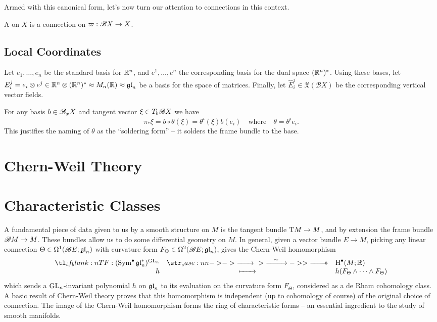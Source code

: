Armed with this canonical form, let's now turn our attention to connections in this context.

\begin{definition}
  A  on $X$ is a connection on $\varpi : \mathscr{B} X \to X$.
\end{definition}

\subsection{Local Coordinates}

Let $e_1,\ldots, e_n$ be the standard basis for $\mathbb{R}^n$, and $e^1,\ldots,e^n$ the corresponding basis for the dual space $(\mathbb{R}^n)^*$. Using these bases, let $E_i^j = e_i\otimes e^j \in \mathbb{R}^n\otimes(\mathbb{R}^n)^* \approx M_n(\mathbb{R}) \approx \mathfrak{gl}_n$ be a basis for the space of matrices. Finally, let $\widehat{E}_i^j\in \mathfrak{X}(\mathscr{B}X)$ be the corresponding vertical vector fields.

For any basis $b\in \mathscr{B}_x X$ and tangent vector $\xi\in T_b \mathscr{B} X$ we have
\[
  \pi_*\xi =  b\circ \theta(\xi) = \theta^i(\xi) b(e_i)\quad\textrm{where}\quad \theta = \theta^i e_i.
\]
This justifies the naming of $\theta$ as the ``soldering form'' -- it solders the frame bundle to the base.


\section{Chern-Weil Theory}

\section{Characteristic Classes}\label{sec:characteristic classes}

A fundamental piece of data given to us by a smooth structure on $M$ is the tangent bundle $\mathrm{T} M \to M$, and by extension the frame bundle $\mathscr{B} M \to M$.
These bundles allow us to do some differential geometry on $M$. In general, given a vector bundle $E\to M$, picking any linear connection $\Theta\in \Omega^1(\mathscr{B} E; \mathfrak{gl}_n)$ with curvature form $F_\Theta \in \Omega^2(\mathscr{B} E; \mathfrak{gl}_n)$, gives the Chern-Weil homomorphism
\[
  \lkxfunc{}{(\Sym^\bullet \gl_n^*)^{\GL_n}}{\H^\bullet(M; \R)}
  {h}{h(F_\Theta\wedge\cdots\wedge F_\Theta)}
\]
which sends a ${\operatorname{GL}}_n$-invariant polynomial $h$ on $\mathfrak{gl}_n$ to its evaluation on the curvature form $F_\Theta$, considered as a de Rham cohomology class. A basic result of Chern-Weil theory proves that this homomorphism is independent (up to cohomology of course) of the original choice of connection. The image of the Chern-Weil homomorphism forms the ring of characteristic forms -- an essential ingredient to the study of smooth manifolds. 

